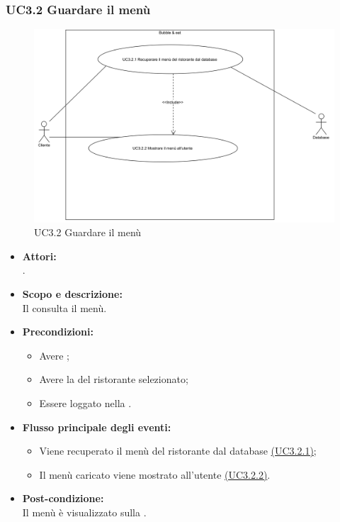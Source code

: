 \subsubsection{UC3.2 Guardare il menù} \label{UC3.2}

\begin{figure}[H]
	\centering
	\includegraphics[width=15cm]{../../documenti/AnalisiDeiRequisiti/Diagrammi_img/uc3_2.png}
	\caption{UC3.2 Guardare il menù}
\end{figure}

\begin{itemize}
	\item \textbf{Attori:}
	\\.
	\item \textbf{Scopo e descrizione:} 
	\\Il {} consulta il menù.
	\item \textbf{Precondizioni:}
	\begin{itemize}
		\item Avere ;
		\item Avere la  del ristorante selezionato;
		\item Essere loggato nella .
	\end{itemize}
	\item \textbf{Flusso principale degli eventi:}
	\begin{itemize}
		\item Viene recuperato il menù del ristorante dal database \hyperref[UC3.2.1]{(UC3.2.1)};
		\item Il menù caricato viene mostrato all'utente \hyperref[UC3.2.2]{(UC3.2.2)}.
	\end{itemize}
	\item \textbf{Post-condizione:}
	\\Il menù è visualizzato sulla .
\end{itemize}

